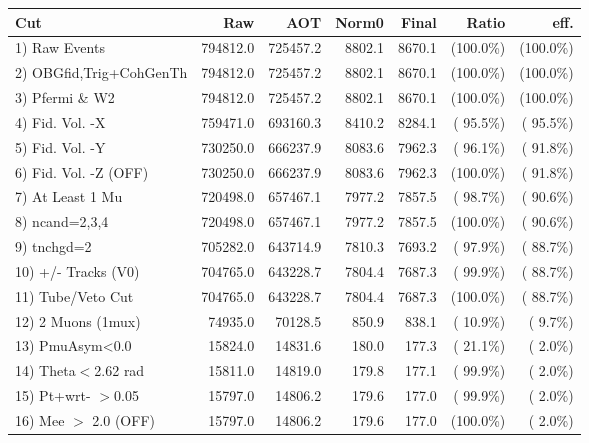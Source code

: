  \begin{table}[h!]\centering
 \begin{tabular}{||l||r|r|r|r|r|r||}
 \hline
 \hline
 Cut & Raw & AOT & Norm0 & Final & Ratio & eff.       \\
 \hline
  1) Raw Events           &     794812.0 &     725457.2 &       8802.1 &       8670.1 & (100.0\%) & (100.0\%) \\
  2) OBGfid,Trig+CohGenTh &     794812.0 &     725457.2 &       8802.1 &       8670.1 & (100.0\%) & (100.0\%) \\
  3) Pfermi \& W2         &     794812.0 &     725457.2 &       8802.1 &       8670.1 & (100.0\%) & (100.0\%) \\
  4) Fid. Vol. -X         &     759471.0 &     693160.3 &       8410.2 &       8284.1 & ( 95.5\%) & ( 95.5\%) \\
  5) Fid. Vol. -Y         &     730250.0 &     666237.9 &       8083.6 &       7962.3 & ( 96.1\%) & ( 91.8\%) \\
  6) Fid. Vol. -Z (OFF)   &     730250.0 &     666237.9 &       8083.6 &       7962.3 & (100.0\%) & ( 91.8\%) \\
  7) At Least 1 Mu        &     720498.0 &     657467.1 &       7977.2 &       7857.5 & ( 98.7\%) & ( 90.6\%) \\
  8) ncand=2,3,4          &     720498.0 &     657467.1 &       7977.2 &       7857.5 & (100.0\%) & ( 90.6\%) \\
  9) tnchgd=2             &     705282.0 &     643714.9 &       7810.3 &       7693.2 & ( 97.9\%) & ( 88.7\%) \\
 10) +/- Tracks (V0)      &     704765.0 &     643228.7 &       7804.4 &       7687.3 & ( 99.9\%) & ( 88.7\%) \\
 11) Tube/Veto Cut        &     704765.0 &     643228.7 &       7804.4 &       7687.3 & (100.0\%) & ( 88.7\%) \\
 12) 2 Muons (1mux)       &      74935.0 &      70128.5 &        850.9 &        838.1 & ( 10.9\%) & (  9.7\%) \\
 13) PmuAsym<0.0          &      15824.0 &      14831.6 &        180.0 &        177.3 & ( 21.1\%) & (  2.0\%) \\
 14) Theta$<$2.62 rad     &      15811.0 &      14819.0 &        179.8 &        177.1 & ( 99.9\%) & (  2.0\%) \\
 15) Pt+wrt- $>$0.05      &      15797.0 &      14806.2 &        179.6 &        177.0 & ( 99.9\%) & (  2.0\%) \\
 16) Mee $>$ 2.0  (OFF)   &      15797.0 &      14806.2 &        179.6 &        177.0 & (100.0\%) & (  2.0\%) \\

\end{tabular}
\end{table}
